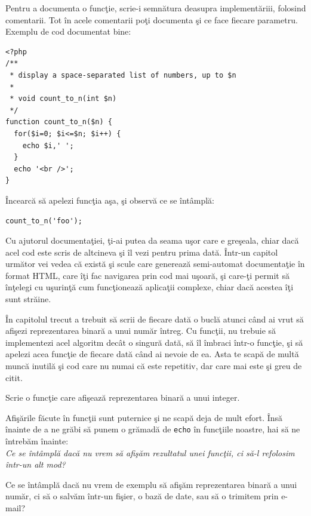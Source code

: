 Pentru a documenta o funcţie, scrie-i semnătura deasupra implementăriii,
folosind comentarii. Tot în acele comentarii poţi documenta şi
ce face fiecare parametru. Exemplu de cod documentat bine:

\begin{lstlisting}
<?php
/**
 * display a space-separated list of numbers, up to $n
 *
 * void count_to_n(int $n)
 */
function count_to_n($n) {
  for($i=0; $i<=$n; $i++) {
	echo $i,' ';
  }
  echo '<br />';
}
\end{lstlisting}

Încearcă să apelezi funcţia aşa, şi observă
ce se întâmplă:
\begin{lstlisting}
count_to_n('foo');
\end{lstlisting}

Cu ajutorul documentaţiei, ţi-ai putea da seama uşor care e greşeala,
chiar dacă acel cod este scris de altcineva şi îl vezi pentru prima dată.
Într-un capitol următor vei vedea că există şi scule care generează semi-automat
documentaţie în format HTML, care îţi fac navigarea prin cod mai uşoară, 
şi care-ţi permit să înţelegi cu uşurinţă cum funcţionează aplicaţii
complexe, chiar dacă acestea îţi sunt străine.

\begin{Exercise}[title={Funcţie care afişează reprezentarea binară}]
În capitolul trecut a trebuit să scrii de fiecare
dată o buclă atunci când ai vrut să afişezi reprezentarea
binară a unui număr întreg. Cu funcţii, nu trebuie
să implementezi acel algoritm decât o singură dată,
să îl {\glqq}îmbraci{\grqq} într-o funcţie, şi să apelezi acea
funcţie de fiecare dată când ai nevoie de ea. Asta te scapă de
multă muncă inutilă şi cod care nu numai că este repetitiv,
dar care mai este şi greu de citit.

Scrie o funcţie care afişează reprezentarea binară a unui integer.
\end{Exercise}

Afişările făcute în funcţii sunt puternice şi ne scapă deja de mult
efort. Însă înainte de a ne grăbi să punem o grămadă de \texttt{echo}
în funcţiile noastre, hai să ne întrebăm înainte:\\
\textit{Ce se întâmplă dacă nu vrem să afişăm rezultatul unei funcţii, ci să-l
refolosim într-un alt mod?}

Ce se întâmplă dacă nu vrem de exemplu să afişăm reprezentarea binară
a unui număr, ci să o salvăm într-un fişier, o bază de date, sau să
o trimitem prin e-mail?


